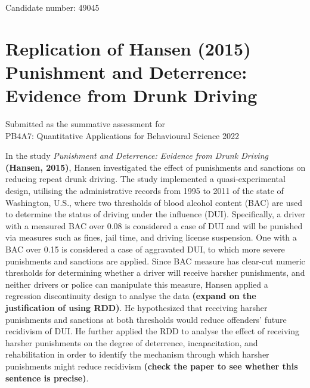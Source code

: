 \documentclass[
  11pt,
]{article}
\author{}
\date{\vspace{-2.5em}}
\begin{document}
\begin{titlepage}

\begin{center}

\vspace*{30mm}

Candidate number: 49045

\vspace*{5mm}

\hypertarget{replication-of-hansen-2015-punishment-and-deterrence-evidence-from-drunk-driving}{%
\section*{Replication of Hansen (2015) Punishment and Deterrence:
Evidence from Drunk
Driving}\label{replication-of-hansen-2015-punishment-and-deterrence-evidence-from-drunk-driving}}

\vspace*{30mm}

Submitted as the summative assessment for\\

PB4A7: Quantitative Applications for Behavioural Science 2022

\end{center}

\end{titlepage}

\newpage

In the study \emph{Punishment and Deterrence: Evidence from Drunk
Driving} \textbf{(Hansen, 2015)}, Hansen investigated the effect of
punishments and sanctions on reducing repeat drunk driving. The study
implemented a quasi-experimental design, utilising the administrative
records from 1995 to 2011 of the state of Washington, U.S., where two
thresholds of blood alcohol content (BAC) are used to determine the
status of driving under the influence (DUI). Specifically, a driver with
a measured BAC over 0.08 is considered a case of DUI and will be
punished via measures such as fines, jail time, and driving license
suspension. One with a BAC over 0.15 is considered a case of aggravated
DUI, to which more severe punishments and sanctions are applied. Since
BAC measure has clear-cut numeric thresholds for determining whether a
driver will receive harsher punishments, and neither drivers or police
can manipulate this measure, Hansen applied a regression discontinuity
design to analyse the data \textbf{(expand on the justification of using
RDD)}. He hypothesized that receiving harsher punishments and sanctions
at both thresholds would reduce offenders' future recidivism of DUI. He
further applied the RDD to analyse the effect of receiving harsher
punishments on the degree of deterrence, incapacitation, and
rehabilitation in order to identify the mechanism through which harsher
punishments might reduce recidivism \textbf{(check the paper to see
whether this sentence is precise)}.
\end{document}
